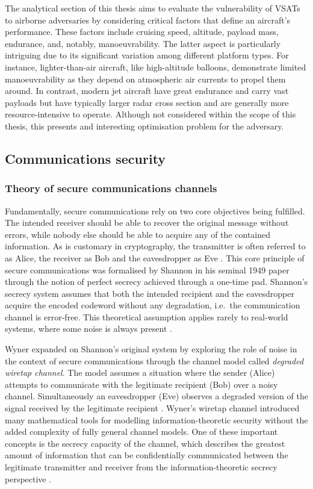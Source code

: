 \documentclass[english, 12pt, a4paper, elec, utf8, a-1b, online]{aaltothesis}
\begin{document}
The analytical section of this thesis aims to evaluate the vulnerability of VSATs to airborne adversaries by considering critical factors that define an aircraft's performance.
These factors include cruising speed, altitude, payload mass, endurance, and, notably, manoeuvrability. The latter aspect is particularly intriguing due to its significant variation among different platform types.
For instance, lighter-than-air aircraft, like high-altitude balloons, demonstrate limited manoeuvrability as they depend on atmospheric air currents to propel them around.
In contrast, modern jet aircraft have great endurance and carry vast payloads but have typically larger radar cross section and are generally more resource-intensive to operate.
Although not considered within the scope of this thesis, this presents and interesting optimisation problem for the adversary.

\subsection{Communications security}
\subsubsection{Theory of secure communications channels}
Fundamentally, secure communications rely on two core objectives being fulfilled.
The intended receiver should be able to recover the original message without errors, while nobody else should be able to acquire any of the contained information.
As is customary in cryptography, the transmitter is often referred to as Alice, the receiver as Bob and the eavesdropper as Eve \cite{bloch2011physical}.
This core principle of secure communications was formalised by Shannon \cite{shannon1949communication} in his seminal 1949 paper through the notion of perfect secrecy achieved through a one-time pad.
Shannon's secrecy system assumes that both the intended recipient and the eavesdropper acquire the encoded codeword without any degradation, i.e.\ the communication channel is error-free.
This theoretical assumption applies rarely to real-world systems, where some noise is always present \cite{bloch2011physical}.

Wyner \cite{wyner1975thewiretap} expanded on Shannon's original system by exploring the role of noise in the context of secure communications through the channel model called \textit{degraded wiretap channel}.
The model assumes a situation where the sender (Alice) attempts to communicate with the legitimate recipient (Bob) over a noisy channel.
Simultaneously an eavesdropper (Eve) observes a degraded version of the signal received by the legitimate recipient \cite{barros2006secrecy}.
Wyner's wiretap channel introduced many mathematical tools for modelling information-theoretic security without the added complexity of fully general channel models.
One of these important concepts is the secrecy capacity of the channel, which describes the greatest amount of information that can be confidentially communicated between the legitimate transmitter and receiver from the information-theoretic secrecy perspective \cite{bloch2011physical}.
\end{document}
